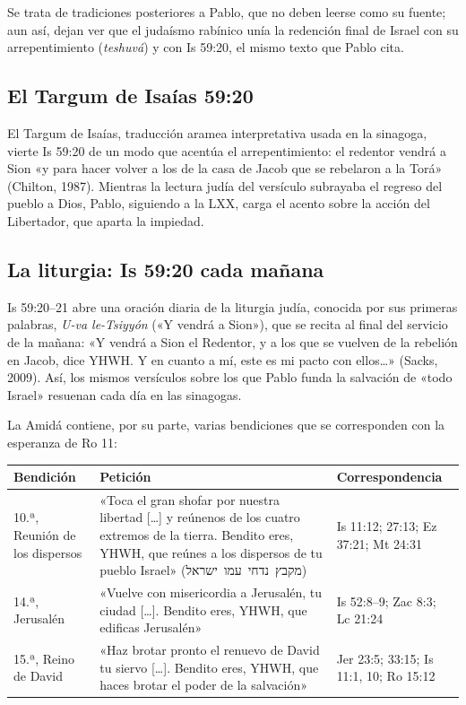 \documentclass[11pt,letterpaper]{article}
\newcommand{\heb}[1]{\mbox{\foreignlanguage{hebrew}{#1}}}
\begin{document}
Se trata de tradiciones posteriores a Pablo, que no deben leerse como su fuente; aun así, dejan ver que el judaísmo rabínico unía la redención final de Israel con su arrepentimiento (\emph{teshuvá}) y con Is 59:20, el mismo texto que Pablo cita.

\subsection{El Targum de Isaías 59:20}
El Targum de Isaías, traducción aramea interpretativa usada en la sinagoga, vierte Is 59:20 de un modo que acentúa el arrepentimiento: el redentor vendrá a Sion «y para hacer volver a los de la casa de Jacob que se rebelaron a la Torá» (Chilton, 1987). Mientras la lectura judía del versículo subrayaba el regreso del pueblo a Dios, Pablo, siguiendo a la LXX, carga el acento sobre la acción del Libertador, que aparta la impiedad.

\subsection{La liturgia: Is 59:20 cada mañana}
Is 59:20--21 abre una oración diaria de la liturgia judía, conocida por sus primeras palabras, \emph{U-va le-Tsiyyón} («Y vendrá a Sion»), que se recita al final del servicio de la mañana: «Y vendrá a Sion el Redentor, y a los que se vuelven de la rebelión en Jacob, dice YHWH. Y en cuanto a mí, este es mi pacto con ellos\ldots» (Sacks, 2009). Así, los mismos versículos sobre los que Pablo funda la salvación de «todo Israel» resuenan cada día en las sinagogas.

La Amidá contiene, por su parte, varias bendiciones que se corresponden con la esperanza de Ro 11:
\begin{center}\small
\renewcommand{\arraystretch}{1.3}
\begin{tabular}{>{\RaggedRight\arraybackslash}p{2.4cm}>{\RaggedRight\arraybackslash}p{5.6cm}>{\RaggedRight\arraybackslash}p{5.8cm}}
\toprule
\textbf{Bendición} & \textbf{Petición} & \textbf{Correspondencia}\\
\midrule
10.ª, Reunión de los dispersos & «Toca el gran shofar por nuestra libertad [\ldots] y reúnenos de los cuatro extremos de la tierra. Bendito eres, YHWH, que reúnes a los dispersos de tu pueblo Israel» (\heb{מקבץ נדחי עמו ישראל}) & Is 11:12; 27:13; Ez 37:21; Mt 24:31\\
14.ª, Jerusalén & «Vuelve con misericordia a Jerusalén, tu ciudad [\ldots]. Bendito eres, YHWH, que edificas Jerusalén» & Is 52:8--9; Zac 8:3; Lc 21:24\\
15.ª, Reino de David & «Haz brotar pronto el renuevo de David tu siervo [\ldots]. Bendito eres, YHWH, que haces brotar el poder de la salvación» & Jer 23:5; 33:15; Is 11:1, 10; Ro 15:12\\
\bottomrule
\end{tabular}\end{center}
\end{document}
